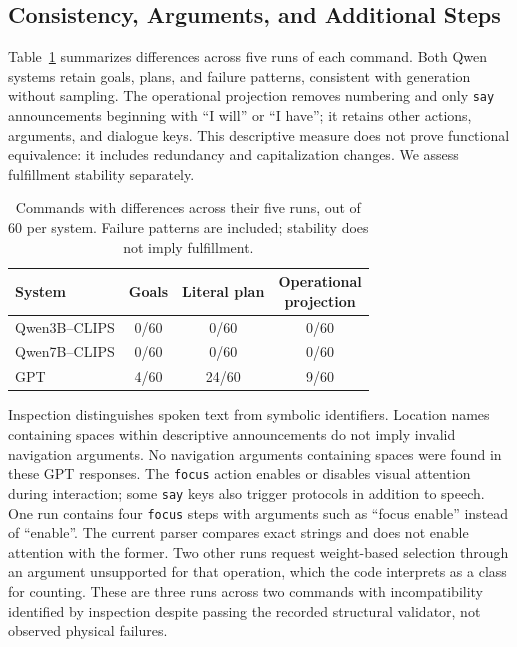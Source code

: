 \documentclass[a4paper,twoside]{article}
\begin{document}
\subsection{Consistency, Arguments, and Additional Steps}
Table~\ref{tab:consistencia} summarizes differences across five runs of each command. Both Qwen systems retain goals, plans, and failure patterns, consistent with generation without sampling. The operational projection removes numbering and only \texttt{say} announcements beginning with ``I will'' or ``I have''; it retains other actions, arguments, and dialogue keys. This descriptive measure does not prove functional equivalence: it includes redundancy and capitalization changes. We assess fulfillment stability separately.

\begin{table}[htbp]
\centering\small
\caption{Commands with differences across their five runs, out of 60 per system. Failure patterns are included; stability does not imply fulfillment.}
\label{tab:consistencia}
\begin{tabularx}{\columnwidth}{@{}lccc@{}}
\toprule
System & Goals & Literal plan & \shortstack{Operational\\projection} \\
\midrule
Qwen3B--CLIPS & 0/60 & 0/60 & 0/60 \\
Qwen7B--CLIPS & 0/60 & 0/60 & 0/60 \\
GPT & 4/60 & 24/60 & 9/60 \\
\bottomrule
\end{tabularx}
\end{table}


Inspection distinguishes spoken text from symbolic identifiers. Location names containing spaces within descriptive announcements do not imply invalid navigation arguments. No navigation arguments containing spaces were found in these GPT responses. The \texttt{focus} action enables or disables visual attention during interaction; some \texttt{say} keys also trigger protocols in addition to speech. One run contains four \texttt{focus} steps with arguments such as ``focus enable'' instead of ``enable''. The current parser compares exact strings and does not enable attention with the former. Two other runs request weight-based selection through an argument unsupported for that operation, which the code interprets as a class for counting. These are three runs across two commands with incompatibility identified by inspection despite passing the recorded structural validator, not observed physical failures.
\end{document}
